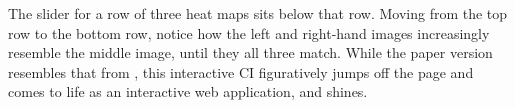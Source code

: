 The slider for a row of three heat maps sits below that row. Moving from the top row to the bottom row, notice how the left and right-hand images increasingly resemble the middle image, until they all three match. While the paper version resembles that from \cite{Cross2015}, this interactive CI figuratively jumps off the page and comes to life as an interactive web application, and shines.



% 
%
% 
